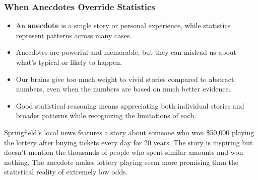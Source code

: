 \documentclass{beamer}
\begin{document}
		\begin{frame}
			\frametitle{When Anecdotes Override Statistics}
			
			\begin{itemize}
				\item An \textbf{anecdote} is a single story or personal experience, while statistics represent patterns across many cases.
				\item Anecdotes are powerful and memorable, but they can mislead us about what's typical or likely to happen.
				\item Our brains give too much weight to vivid stories compared to abstract numbers, even when the numbers are based on much better evidence.
				\item Good statistical reasoning means appreciating both individual stories and broader patterns while recognizing the limitations of each.
			\end{itemize}
			
			\begin{example}
				Springfield's local news features a story about someone who won \$50,000 playing the lottery after buying tickets every day for 20 years. The story is inspiring but doesn't mention the thousands of people who spent similar amounts and won nothing. The anecdote makes lottery playing seem more promising than the statistical reality of extremely low odds.
				\end{example}
					
				\end{frame}
				
\end{document}
